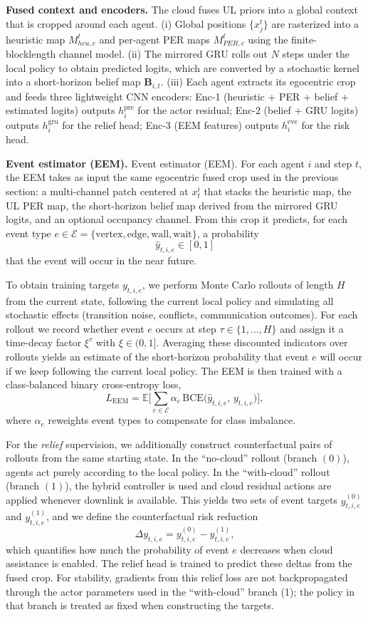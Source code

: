 \documentclass[conference]{IEEEtran}
\begin{document}
\textbf{Fused context and encoders.}
The cloud fuses UL priors into a global context that is cropped around each
agent.
(i) Global positions $\{x_j^t\}$ are rasterized into a heuristic map $M_{heu,c}^t$ and
per-agent PER maps $M_{PER,c}^t$ using the finite-blocklength channel model.
(ii) The mirrored GRU rolls out $N$ steps under the local policy to obtain
predicted logits, which are converted by a stochastic kernel into a
short-horizon belief map $\mathbf B_{i,t}$.
(iii) Each agent extracts its egocentric crop and feeds three lightweight CNN
encoders: Enc-1 (heuristic + PER + belief + estimated logits) outputs
$h_i^{\text{pre}}$ for the actor residual; Enc-2 (belief + GRU logits) outputs
$h_i^{\text{gru}}$ for the relief head; Enc-3 (EEM features) outputs
$h_i^{\text{eve}}$ for the risk head.

\textbf{Event estimator (EEM).}
Event estimator (EEM). For each agent $i$ and step $t$, the EEM takes as input the same egocentric fused crop used in the previous section: a multi-channel patch centered at $x_t^i$ that stacks the heuristic map, the UL PER map, the short-horizon belief map derived from the mirrored GRU logits, and an optional occupancy channel. From this crop it predicts, for each event type $e \in \mathcal{E} = \{\text{vertex}, \text{edge}, \text{wall}, \text{wait}\}$, a probability
\[
\hat y_{t,i,e} \in [0,1]
\]
that the event will occur in the near future.

To obtain training targets $y_{t,i,e}$, we perform Monte Carlo rollouts of length $H$ from the current state, following the current local policy and simulating all stochastic effects (transition noise, conflicts, communication outcomes). For each rollout we record whether event $e$ occurs at step $\tau \in \{1,\dots,H\}$ and assign it a time-decay factor $\xi^\tau$ with $\xi \in (0,1]$. Averaging these discounted indicators over rollouts yields an estimate of the short-horizon probability that event $e$ will occur if we keep following the current local policy. The EEM is then trained with a class-balanced binary cross-entropy loss,
\[
L_{\mathrm{EEM}} = \mathbb{E}\Bigg[\sum_{e\in\mathcal{E}} \alpha_e \, \mathrm{BCE}\big(\hat y_{t,i,e},\, y_{t,i,e}\big)\Bigg],
\tag{6}
\]
where $\alpha_e$ reweights event types to compensate for class imbalance.

For the \emph{relief} supervision, we additionally construct counterfactual pairs of rollouts from the same starting state. In the “no-cloud” rollout (branch $(0)$), agents act purely according to the local policy. In the “with-cloud” rollout (branch $(1)$), the hybrid controller is used and cloud residual actions are applied whenever downlink is available. This yields two sets of event targets $y^{(0)}_{t,i,e}$ and $y^{(1)}_{t,i,e}$, and we define the counterfactual risk reduction
\[
\Delta y_{t,i,e} = y^{(0)}_{t,i,e} - y^{(1)}_{t,i,e},
\]
which quantifies how much the probability of event $e$ decreases when cloud assistance is enabled. The relief head is trained to predict these deltas from the fused crop. For stability, gradients from this relief loss are not backpropagated through the actor parameters used in the “with-cloud” branch (1); the policy in that branch is treated as fixed when constructing the targets.
\end{document}
